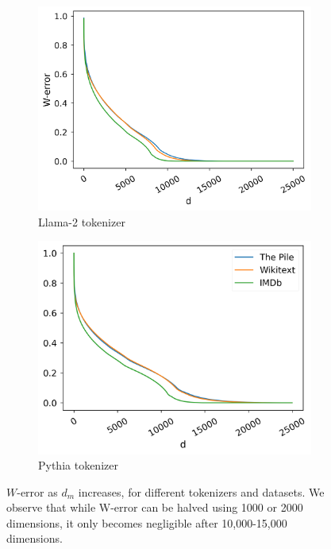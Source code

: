 \begin{figure}[ht]
\centering
    \begin{subfigure}{0.415\columnwidth}
         \includegraphics[width=\linewidth]{sources/part_1/softmax_bottleneck/imgs/llama_sv_4gram.png}
         \caption{Llama-2 tokenizer}
         \label{fig:llama}
    \end{subfigure}
    \begin{subfigure}{0.4\columnwidth}
         \includegraphics[width=\linewidth]{sources/part_1/softmax_bottleneck/imgs/pythia_sv_4gram.png}
         \caption{Pythia tokenizer}
         \label{fig:pythia}
    \end{subfigure}
    \caption{$W$\!-error as $d_m$ increases, for different tokenizers and datasets. We observe that while W-error can be halved using 1000 or 2000 dimensions, it only becomes negligible after 10,000-15,000 dimensions.}
    \label{fig:w_error}
\end{figure}

